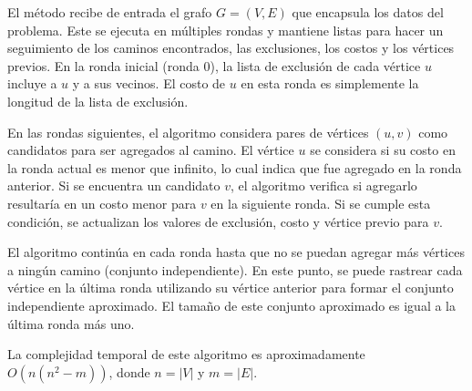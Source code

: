 \documentclass[10pt]{article} %
\begin{document}
	El m\'etodo recibe de entrada el grafo $G=(V, E)$ que encapsula los datos del problema. Este se ejecuta en múltiples rondas y mantiene listas para hacer un seguimiento de los caminos encontrados, las exclusiones, los costos y los vértices previos. En la ronda inicial (ronda 0), la lista de exclusión de cada vértice $u$ incluye a $u$ y a sus vecinos. El costo de $u$ en esta ronda es simplemente la longitud de la lista de exclusión.
	
	En las rondas siguientes, el algoritmo considera pares de vértices $(u, v)$ como candidatos para ser agregados al camino. El vértice $u$ se considera si su costo en la ronda actual es menor que infinito, lo cual indica que fue agregado en la ronda anterior. Si se encuentra un candidato $v$, el algoritmo verifica si agregarlo resultaría en un costo menor para $v$ en la siguiente ronda. Si se cumple esta condición, se actualizan los valores de exclusión, costo y vértice previo para $v$.
	
	El algoritmo continúa en cada ronda hasta que no se puedan agregar más vértices a ningún camino (conjunto independiente). En este punto, se puede rastrear cada vértice en la última ronda utilizando su vértice anterior para formar el conjunto independiente aproximado. El tamaño de este conjunto aproximado es igual a la última ronda más uno. 
	
	La complejidad temporal de este algoritmo es aproximadamente $O(n(n^2-m))$, donde $n = |V|$ y $m = |E|$.
	
\end{document}
